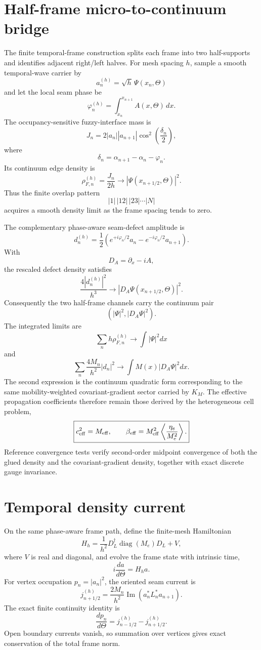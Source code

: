 \section{Half-frame micro-to-continuum bridge}

The finite temporal-frame construction splits each frame into two half-supports and identifies adjacent right/left halves.  For mesh spacing $h$, sample a smooth temporal-wave carrier by
\[
\boxed{
a_n^{(h)}=\sqrt h\,\Psi(x_n,\Theta)}
\]
and let the local seam phase be
\[
\boxed{
\varphi_n^{(h)}
=\int_{x_n}^{x_{n+1}}A(x,\Theta)\,dx.
}
\]
The occupancy-sensitive fuzzy-interface mass is
\[
J_n
=2|a_n||a_{n+1}|
\cos^2\!\left(\frac{\delta_n}{2}\right),
\]
where
\[
\delta_n
=\alpha_{n+1}-\alpha_n-\varphi_n.
\]
Its continuum edge density is
\[
\boxed{
\rho_{F,n}^{(h)}
=\frac{J_n}{2h}
\longrightarrow
|\Psi(x_{n+1/2},\Theta)|^2.
}
\]
Thus the finite overlap pattern
\[
|1|\,|12|\,|23|\cdots|N|
\]
acquires a smooth density limit as the frame spacing tends to zero.

The complementary phase-aware seam-defect amplitude is
\[
\boxed{
d_n^{(h)}
=\frac12\left(
 e^{+i\varphi_n/2}a_n
-e^{-i\varphi_n/2}a_{n+1}
\right).
}
\]
With
\[
D_A=\partial_x-iA,
\]
the rescaled defect density satisfies
\[
\boxed{
\frac{4|d_n^{(h)}|^2}{h^3}
\longrightarrow
|D_A\Psi(x_{n+1/2},\Theta)|^2.
}
\]
Consequently the two half-frame channels carry the continuum pair
\[
\boxed{
\left(
|\Psi|^2,
|D_A\Psi|^2
\right).
}
\]
The integrated limits are
\[
\boxed{
\sum_n h\rho_{F,n}^{(h)}
\longrightarrow
\int |\Psi|^2dx
}
\]
and
\[
\boxed{
\sum_n\frac{4M_n}{h^2}|d_n|^2
\longrightarrow
\int M(x)|D_A\Psi|^2dx.
}
\]
The second expression is the continuum quadratic form corresponding to the same mobility-weighted covariant-gradient sector carried by $K_M$.  The effective propagation coefficients therefore remain those derived by the heterogeneous cell problem,
\[
\boxed{
c_{\rm eff}^2=M_{\rm eff},
\qquad
\beta_{\rm eff}
=M_{\rm eff}^2\left\langle\frac{\eta_e}{M_e^2}\right\rangle.
}
\]
Reference convergence tests verify second-order midpoint convergence of both the glued density and the covariant-gradient density, together with exact discrete gauge invariance.

\section{Temporal density current}

On the same phase-aware frame path, define the finite-mesh Hamiltonian
\[
\boxed{
H_h
=\frac1{h^2}D_L^\dagger\operatorname{diag}(M_e)D_L+V,
}
\]
where $V$ is real and diagonal, and evolve the frame state with intrinsic time,
\[
\boxed{
i\frac{da}{d\Theta}=H_ha.}
\]
For vertex occupation $p_n=|a_n|^2$, the oriented seam current is
\[
\boxed{
j_{n+1/2}^{(h)}
=\frac{2M_n}{h^2}
\operatorname{Im}\!\left(a_n^*L_n^*a_{n+1}\right).
}
\]
The exact finite continuity identity is
\[
\boxed{
\frac{dp_n}{d\Theta}
=j_{n-1/2}^{(h)}-j_{n+1/2}^{(h)}.
}
\]
Open boundary currents vanish, so summation over vertices gives exact conservation of the total frame norm.


